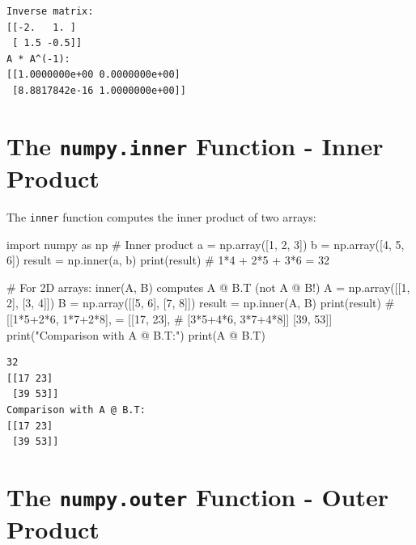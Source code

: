 \documentclass[
  english,
  letterpaper,
  DIV=11,
  numbers=noendperiod]{scrreprt}
\newenvironment{Shaded}{\begin{snugshade}}{\end{snugshade}}
\newcommand{\BuiltInTok}[1]{\textcolor[rgb]{0.00,0.23,0.31}{#1}}
\newcommand{\CommentTok}[1]{\textcolor[rgb]{0.37,0.37,0.37}{#1}}
\newcommand{\DecValTok}[1]{\textcolor[rgb]{0.68,0.00,0.00}{#1}}
\newcommand{\ImportTok}[1]{\textcolor[rgb]{0.00,0.46,0.62}{#1}}
\newcommand{\NormalTok}[1]{\textcolor[rgb]{0.00,0.23,0.31}{#1}}
\newcommand{\OperatorTok}[1]{\textcolor[rgb]{0.37,0.37,0.37}{#1}}
\newcommand{\StringTok}[1]{\textcolor[rgb]{0.13,0.47,0.30}{#1}}
\begin{document}
\begin{verbatim}
Inverse matrix:
[[-2.   1. ]
 [ 1.5 -0.5]]
A * A^(-1):
[[1.0000000e+00 0.0000000e+00]
 [8.8817842e-16 1.0000000e+00]]
\end{verbatim}

\section{\texorpdfstring{The \texttt{numpy.inner} Function - Inner
Product}{The numpy.inner Function - Inner Product}}\label{the-numpy.inner-function---inner-product}

The \texttt{inner} function computes the inner product of two arrays:

\begin{Shaded}
\begin{Highlighting}[]
\ImportTok{import}\NormalTok{ numpy }\ImportTok{as}\NormalTok{ np}
\CommentTok{\# Inner product}
\NormalTok{a }\OperatorTok{=}\NormalTok{ np.array([}\DecValTok{1}\NormalTok{, }\DecValTok{2}\NormalTok{, }\DecValTok{3}\NormalTok{])}
\NormalTok{b }\OperatorTok{=}\NormalTok{ np.array([}\DecValTok{4}\NormalTok{, }\DecValTok{5}\NormalTok{, }\DecValTok{6}\NormalTok{])}
\NormalTok{result }\OperatorTok{=}\NormalTok{ np.inner(a, b)}
\BuiltInTok{print}\NormalTok{(result)  }\CommentTok{\# 1*4 + 2*5 + 3*6 = 32}

\CommentTok{\# For 2D arrays: inner(A, B) computes A @ B.T (not A @ B!)}
\NormalTok{A }\OperatorTok{=}\NormalTok{ np.array([[}\DecValTok{1}\NormalTok{, }\DecValTok{2}\NormalTok{], [}\DecValTok{3}\NormalTok{, }\DecValTok{4}\NormalTok{]])}
\NormalTok{B }\OperatorTok{=}\NormalTok{ np.array([[}\DecValTok{5}\NormalTok{, }\DecValTok{6}\NormalTok{], [}\DecValTok{7}\NormalTok{, }\DecValTok{8}\NormalTok{]])}
\NormalTok{result }\OperatorTok{=}\NormalTok{ np.inner(A, B)}
\BuiltInTok{print}\NormalTok{(result)}
\CommentTok{\# [[1*5+2*6, 1*7+2*8],   = [[17, 23],}
\CommentTok{\#  [3*5+4*6, 3*7+4*8]]      [39, 53]]}
\BuiltInTok{print}\NormalTok{(}\StringTok{"Comparison with A @ B.T:"}\NormalTok{)}
\BuiltInTok{print}\NormalTok{(A }\OperatorTok{@}\NormalTok{ B.T)}
\end{Highlighting}
\end{Shaded}

\begin{verbatim}
32
[[17 23]
 [39 53]]
Comparison with A @ B.T:
[[17 23]
 [39 53]]
\end{verbatim}

\section{\texorpdfstring{The \texttt{numpy.outer} Function - Outer
Product}{The numpy.outer Function - Outer Product}}\label{the-numpy.outer-function---outer-product}
\end{document}
